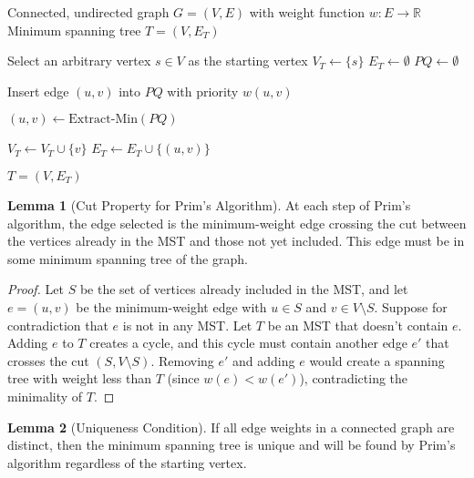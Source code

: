 \documentclass{article}
\theoremstyle{definition}
\newtheorem{lemma}{Lemma}
\begin{document}
\begin{algorithm}
\caption{Prim's Algorithm for Minimum Spanning Tree}
\begin{algorithmic}[1]
\Require Connected, undirected graph $G = (V, E)$ with weight function $w : E \rightarrow \mathbb{R}$
\Ensure Minimum spanning tree $T = (V, E_T)$

    \State Select an arbitrary vertex $s \in V$ as the starting vertex
    \State $V_T \gets \{s\}$ 
    \State $E_T \gets \emptyset$ 
    \State $PQ \gets \emptyset$ 
    
            \State Insert edge $(u,v)$ into $PQ$ with priority $w(u,v)$
        \EndFor
        
        \State $(u,v) \gets \text{Extract-Min}(PQ)$ 
        
        \State $V_T \gets V_T \cup \{v\}$ 
        \State $E_T \gets E_T \cup \{(u,v)\}$ 
    \EndWhile
    
    \State \Return $T = (V, E_T)$
\EndProcedure
\end{algorithmic}
\end{algorithm}
\begin{lemma}[Cut Property for Prim's Algorithm]
At each step of Prim's algorithm, the edge selected is the minimum-weight edge crossing the cut between the vertices already in the MST and those not yet included. This edge must be in some minimum spanning tree of the graph.
\end{lemma}
\begin{proof}
Let $S$ be the set of vertices already included in the MST, and let $e = (u,v)$ be the minimum-weight edge with $u \in S$ and $v \in V \setminus S$. Suppose for contradiction that $e$ is not in any MST. Let $T$ be an MST that doesn't contain $e$. Adding $e$ to $T$ creates a cycle, and this cycle must contain another edge $e'$ that crosses the cut $(S, V \setminus S)$. Removing $e'$ and adding $e$ would create a spanning tree with weight less than $T$ (since $w(e) < w(e')$), contradicting the minimality of $T$.
\end{proof}

\begin{lemma}[Uniqueness Condition]
If all edge weights in a connected graph are distinct, then the minimum spanning tree is unique and will be found by Prim's algorithm regardless of the starting vertex.
\end{lemma}
\end{document}
